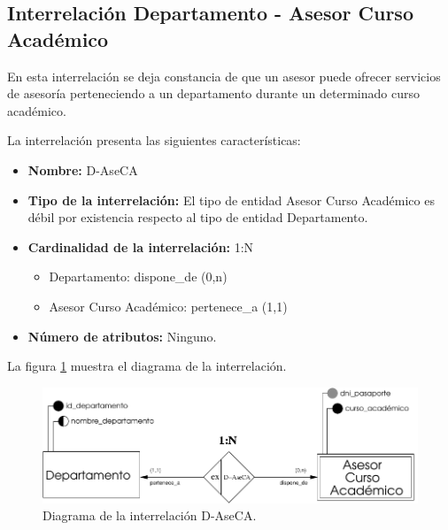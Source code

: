 \subsection{Interrelación Departamento - Asesor Curso Académico}

   \begin{description}
      \item[Definición] En esta interrelación se deja constancia de que un
      asesor puede ofrecer servicios de asesoría perteneciendo a un departamento
      durante un determinado curso académico.

      \item[Características] La interrelación presenta las siguientes
                             características:

         \begin{itemize}
            \item \textbf{Nombre:} D-AseCA
            \item \textbf{Tipo de la interrelación:} El tipo de entidad
                  Asesor Curso Académico es débil por existencia respecto al
                  tipo de entidad Departamento.
            \item \textbf{Cardinalidad de la interrelación:} 1:N
                  \begin{itemize}
                     \item Departamento: dispone\_de (0,n)
                     \item Asesor Curso Académico: pertenece\_a (1,1)
                  \end{itemize}
            \item \textbf{Número de atributos:} Ninguno.
         \end{itemize}

      \item[Diagrama] La figura \ref{diagramaD-AseCA} muestra el diagrama de la
                      interrelación.

      \item \begin{figure}[!ht]
            \begin{center}
            \includegraphics[]{07.Modelo_Entidad-Interrelacion/7.3.Analisis_Interrelaciones/diagramas/D-AseCA.pdf}
            \caption{Diagrama de la interrelación D-AseCA.}
            \label{diagramaD-AseCA}
            \end{center}
         \end{figure}


\end{description}
